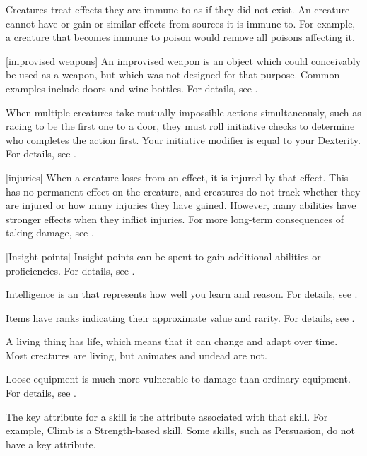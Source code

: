  Creatures treat effects they are immune to as if they did not exist.
An creature cannot have or gain  or similar effects from sources it is immune to.
For example, a creature that becomes immune to poison would remove all poisons affecting it.

[improvised weapons] An improvised weapon is an object which could conceivably be used as a weapon, but which was not designed for that purpose.
Common examples include doors and wine bottles.
For details, see .

 When multiple creatures take mutually impossible actions simultaneously, such as racing to be the first one to a door, they must roll initiative checks to determine who completes the action first.
Your initiative modifier is equal to your Dexterity.
For details, see .

[injuries] When a creature loses  from an effect, it is injured by that effect.
This has no permanent effect on the creature, and creatures do not track whether they are injured or how many injuries they have gained.
However, many abilities have stronger effects when they inflict injuries.
For more long-term consequences of taking damage, see .

[Insight points] Insight points can be spent to gain additional abilities or proficiencies.
For details, see .

 Intelligence is an  that represents how well you learn and reason.
For details, see .

 Items have ranks indicating their approximate value and rarity.
For details, see .

 A living thing has life, which means that it can change and adapt over time.
Most creatures are living, but animates and undead are not.

 Loose equipment is much more vulnerable to damage than ordinary equipment.
For details, see .

 The key attribute for a skill is the attribute associated with that skill.
For example, Climb is a Strength-based skill.
Some skills, such as Persuasion, do not have a key attribute.

